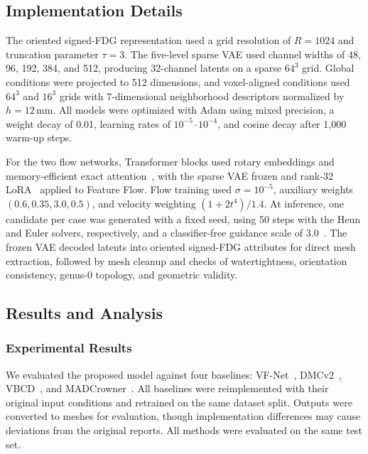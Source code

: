 \documentclass[preprint,review,12pt]{elsarticle}
\begin{document}
\subsection{Implementation Details}\label{subsec4_3}

\hspace{2em}The oriented signed-FDG representation used a grid resolution of \(R=1024\) and truncation parameter \(\tau=3\). The five-level sparse VAE used channel widths of 48, 96, 192, 384, and 512, producing 32-channel latents on a sparse \(64^3\) grid. Global conditions were projected to 512 dimensions, and voxel-aligned conditions used \(64^3\) and \(16^3\) grids with 7-dimensional neighborhood descriptors normalized by \(h=12\,\mathrm{mm}\). All models were optimized with Adam using mixed precision, a weight decay of 0.01, learning rates of \(10^{-5}\)--\(10^{-4}\), and cosine decay after 1,000 warm-up steps.

\hspace{2em}For the two flow networks, Transformer blocks used rotary embeddings and memory-efficient exact attention~\cite{Su2024RoFormer,Dao2022FlashAttention}, with the sparse VAE frozen and rank-32 LoRA~\cite{hu2022lora} applied to Feature Flow. Flow training used \(\sigma=10^{-5}\), auxiliary weights \((0.6,0.35,3.0,0.5)\), and velocity weighting \((1+2t^4)/1.4\). At inference, one candidate per case was generated with a fixed seed, using 50 steps with the Heun and Euler solvers, respectively, and a classifier-free guidance scale of 3.0~\cite{Ho2022ClassifierFree}. The frozen VAE decoded latents into oriented signed-FDG attributes for direct mesh extraction, followed by mesh cleanup and checks of watertightness, orientation consistency, genus-0 topology, and geometric validity.


\subsection{Results and Analysis}\label{subsec4}

\subsubsection{Experimental Results}\label{subsubsec4_4_1}

\hspace{2em}We evaluated the proposed model against four baselines: VF-Net~\cite{ye2024variational}, DMCv2~\cite{Hosseinimanesh2025PointToMesh}, VBCD~\cite{Wei2025VBCD}, and MADCrowner~\cite{Wei2026MADCrowner}. All baselines were reimplemented with their original input conditions and retrained on the same dataset split. Outputs were converted to meshes for evaluation, though implementation differences may cause deviations from the original reports. All methods were evaluated on the same test set.
\end{document}

